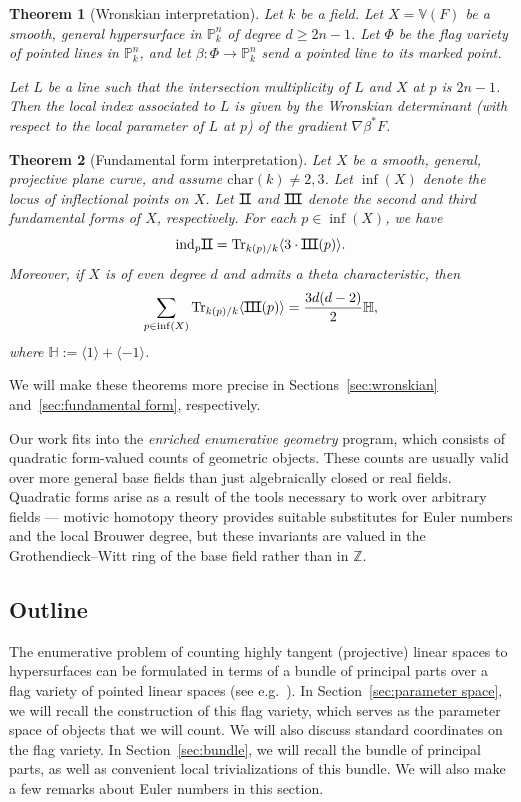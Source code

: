 \documentclass[12pt]{amsart}
\numberwithin{equation}{section}
\theoremstyle{plain}
\newtheorem{thm}{Theorem}[section]
\theoremstyle{definition}
\newcommand{\mb}[1]{\mathbb{#1}}
\newcommand{\Tr}{\mathrm{Tr}}
\newcommand{\ind}{\mathrm{ind}}
\newcommand{\II}{\sbox0{II}\dimen0=\dimexpr\wd0+1pt\relax
  \makebox[\dimen0]{\rlap{\vrule width\dimen0 height 0.07ex depth 0.07ex}%
    \rlap{\vrule width\dimen0 height\dimexpr\ht0+0.07ex\relax 
            depth\dimexpr-\ht0+0.07ex\relax}%
    \kern.5pt \textnormal{II}\kern.5pt}}
\newcommand{\III}{\sbox0{III}\dimen0=\dimexpr\wd0+1pt\relax
  \makebox[\dimen0]{\rlap{\vrule width\dimen0 height 0.07ex depth 0.07ex}%
    \rlap{\vrule width\dimen0 height\dimexpr\ht0+0.07ex\relax 
            depth\dimexpr-\ht0+0.07ex\relax}%
    \kern.5pt \textnormal{III}\kern.5pt}}
\begin{document}
\begin{thm}[Wronskian interpretation]\label{thm:wronskian}
    Let $k$ be a field. Let $X=\mb{V}(F)$ be a smooth, general hypersurface in $\mb{P}^n_k$ of degree $d\geq 2n-1$. Let $\Phi$ be the flag variety of pointed lines in $\mb{P}^n_k$, and let $\beta\colon \Phi\to\mb{P}^n_k$ send a pointed line to its marked point.
    
    Let $L$ be a line such that the intersection multiplicity of $L$ and $X$ at $p$ is $2n-1$. Then the local index associated to $L$ is given by the Wronskian determinant (with respect to the local parameter of $L$ at $p$) of the gradient $\nabla\beta^*F$.
\end{thm}

\begin{thm}[Fundamental form interpretation]\label{thm:fundamental form}
Let $X$ be a smooth, general, projective plane curve, and assume $\mathrm{char}(k)\neq2,3$. Let $\inf(X)$ denote the locus of inflectional points on $X$. Let $\II$ and $\III$ denote the second and third fundamental forms of $X$, respectively. For each $p\in\inf(X)$, we have
\[\ind_p\II=\Tr_{k(p)/k}\langle 3\cdot\III(p)\rangle.\]
Moreover, if $X$ is of even degree $d$ and admits a theta characteristic, then
\[\sum_{p\in\inf(X)}\Tr_{k(p)/k}\langle\III(p)\rangle=\frac{3d(d-2)}{2}\mb{H},\]
where $\mb{H}:=\langle1\rangle+\langle-1\rangle$.
\end{thm}

We will make these theorems more precise in Sections~\ref{sec:wronskian} and~\ref{sec:fundamental form}, respectively.

Our work fits into the \emph{enriched enumerative geometry} program, which consists of quadratic form-valued counts of geometric objects. These counts are usually valid over more general base fields than just algebraically closed or real fields. Quadratic forms arise as a result of the tools necessary to work over arbitrary fields --- motivic homotopy theory provides suitable substitutes for Euler numbers and the local Brouwer degree, but these invariants are valued in the Grothendieck--Witt ring of the base field rather than in $\mb{Z}$.

\subsection{Outline}
The enumerative problem of counting highly tangent (projective) linear spaces to hypersurfaces can be formulated in terms of a bundle of principal parts over a flag variety of pointed linear spaces (see e.g.~\cite[\S 11.1]{3264}). In Section~\ref{sec:parameter space}, we will recall the construction of this flag variety, which serves as the parameter space of objects that we will count. We will also discuss standard coordinates on the flag variety. In Section~\ref{sec:bundle}, we will recall the bundle of principal parts, as well as convenient local trivializations of this bundle. We will also make a few remarks about Euler numbers in this section.
\end{document}
